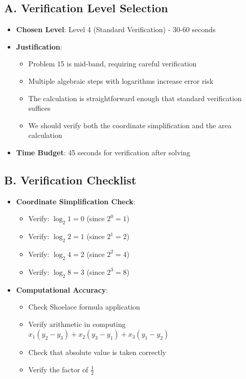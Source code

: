 \documentclass[12pt]{article}
\begin{document}
\begin{verificationbox}
\subsection*{A. Verification Level Selection}
\begin{itemize}[leftmargin=*]
    \item \textbf{Chosen Level}: Level 4 (Standard Verification) - 30-60 seconds
    
    \item \textbf{Justification}: 
    \begin{itemize}
        \item Problem 15 is mid-band, requiring careful verification
        \item Multiple algebraic steps with logarithms increase error risk
        \item The calculation is straightforward enough that standard verification suffices
        \item We should verify both the coordinate simplification and the area calculation
    \end{itemize}
    
    \item \textbf{Time Budget}: 45 seconds for verification after solving
\end{itemize}

\subsection*{B. Verification Checklist}
\begin{itemize}[leftmargin=*]
    \item \textbf{Coordinate Simplification Check}:
    \begin{itemize}
        \item Verify: $\log_2 1 = 0$ (since $2^0 = 1$) \checkmark
        \item Verify: $\log_2 2 = 1$ (since $2^1 = 2$) \checkmark
        \item Verify: $\log_2 4 = 2$ (since $2^2 = 4$) \checkmark
        \item Verify: $\log_2 8 = 3$ (since $2^3 = 8$) \checkmark
    \end{itemize}
    
    \item \textbf{Computational Accuracy}:
    \begin{itemize}
        \item Check Shoelace formula application
        \item Verify arithmetic in computing $x_1(y_2-y_3) + x_2(y_3-y_1) + x_3(y_1-y_2)$
        \item Check that absolute value is taken correctly
        \item Verify the factor of $\frac{1}{2}$
    \end{itemize}
    

\end{itemize}
\end{verificationbox}
\end{document}
